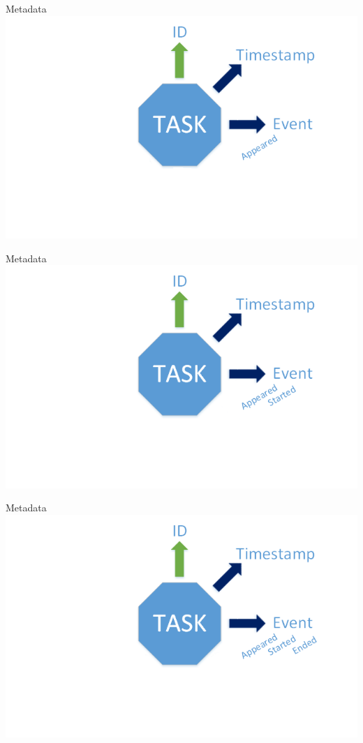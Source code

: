 	\begin{frame}{Metadata}
	\includegraphics[width=1.0\textwidth]{images/Task/metadata5.png}
	\end{frame}
	
	\begin{frame}{Metadata}
	\includegraphics[width=1.0\textwidth]{images/Task/metadata6.png}
	\end{frame}
	
	\begin{frame}{Metadata}
	\includegraphics[width=1.0\textwidth]{images/Task/metadata7.png}
	\end{frame}
	
